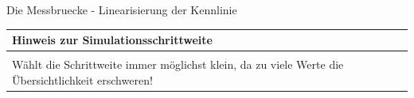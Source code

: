 \begin{frame}[t]{Die Messbruecke - Linearisierung der Kennlinie}
\begin{spacing}{0.9}
\begin{tiny}
\begin{table}[h!]
\begin{tabular}{p{10cm} }
                    \hline
                    \textbf{Hinweis zur Simulationsschrittweite} \\
                    \hline                                       \\
                    \begin{minipage}{\textwidth}
                        Wählt die Schrittweite immer möglichst klein, da zu viele Werte die Übersichtlichkeit erschweren!
                    \end{minipage}
                \end{tabular}

            \end{table}

        \end{tiny} \end{spacing}

\end{frame}

